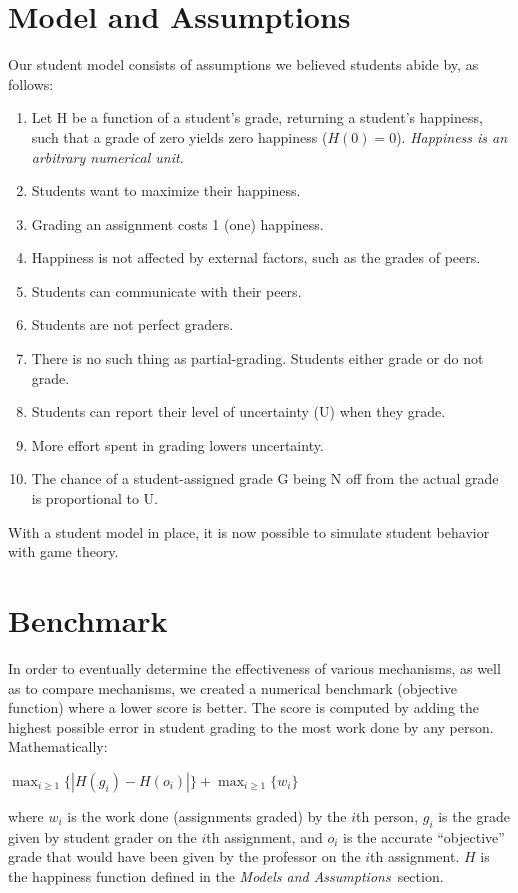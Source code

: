 \documentclass{chi-ext}
\begin{document}
\section{Model and Assumptions}
\label{sec:modelandassumptions}
Our student model consists of assumptions we believed students abide by, as follows:
\begin{enumerate}
\item Let H be a function of a student's grade, returning a student's happiness, such that a grade of zero yields zero happiness ($H(0)=0$). \newline \textit{Happiness is an arbitrary numerical unit.}
\item Students want to maximize their happiness.
\item Grading an assignment costs 1 (one) happiness.
\item Happiness is not affected by external factors, such as the grades of peers.
\item Students can communicate with their peers.
\item Students are not perfect graders.
\item There is no such thing as partial-grading. Students either grade or do not grade.
\item Students can report their level of uncertainty (U) when they grade.
\item More effort spent in grading lowers uncertainty.
\item The chance of a student-assigned grade G being N off from the actual grade is proportional to U.
\end{enumerate}

With a student model in place, it is now possible to simulate student behavior with game theory.

\section{Benchmark}
In order to eventually determine the effectiveness of various mechanisms, as well as to compare mechanisms, we created a numerical benchmark (objective function) where a lower score is better. The score is computed by adding the highest possible error in student grading to the most work done by any person. Mathematically:

$\max_{i \ge 1} \{|H(g_i)-H(o_i)|\} + \max_{i \ge 1} \{w_i\}$

where $w_i$ is the work done (assignments graded) by the $i$th person, $g_i$ is the grade given by student grader on the $i$th assignment, and $o_i$ is the accurate ``objective'' grade that would have been given by the professor on the $i$th assignment. $H$ is the happiness function defined in the \textit{Models and Assumptions}~section.
\end{document}
